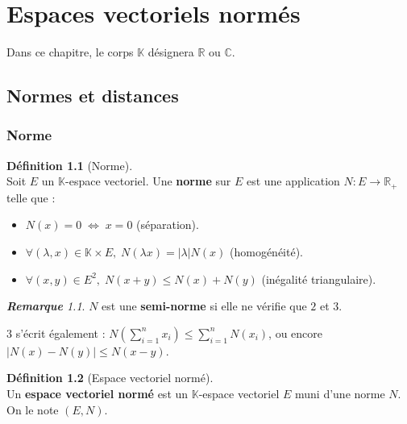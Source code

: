 \documentclass[12pt]{book}
\let\ensembleNombre\mathbb
\newcommand*\R{\ensuremath{\ensembleNombre{R}}}
\newcommand*\C{\ensuremath{\ensembleNombre{C}}}
\newcommand*\K{\ensuremath{\ensembleNombre{K}}}
\theoremstyle{definition}
\newtheorem*{defi}{Définition}
\theoremstyle{remark}
\newtheorem*{rem}{\textbf{Remarque}}
\newenvironment{fdef}
  {\begin{mdframed}[roundcorner=10pt, linewidth=1pt]\begin{defi}}
  {\end{defi}\end{mdframed}}
\begin{document}
\chapter{Espaces vectoriels normés}
	Dans ce chapitre, le corps $\K$ désignera $\R$ ou $\C$.
	
	\section{Normes et distances}
		\subsection{Norme}
	\begin{fdef}[Norme]\mbox{~}\\
	Soit $E$ un $\K$-espace vectoriel. Une \textbf{norme} sur $E$ est une application $N : E \longrightarrow \R_+$ telle que :
	\begin{itemize}
	\item[1)] $N(x) = 0 \;\Longleftrightarrow\; x = 0$ (séparation).
	\item[2)] $\forall (\lambda, x) \in \K \times E,\; N(\lambda x) = |\lambda|N(x)$ (homogénéité).
	\item[3)] $\forall (x,y) \in E^2, \; N(x+y) \leq N(x) + N(y)$ (inégalité triangulaire).
	\end{itemize}
	\end{fdef}
	
	\begin{rem}
	$N$ est une \textbf{semi-norme} si elle ne vérifie que $2$ et $3$.
	\end{rem}
	
	$3$ s'écrit également : $N\left( \sum_{i=1}^n x_i \right) \leq \sum_{i=1}^n N(x_i)$, ou encore $|N(x) - N(y)| \leq N(x-y)$.
	
	\begin{fdef}[Espace vectoriel normé]\mbox{~}\\
	Un \textbf{espace vectoriel normé} est un $\K$-espace vectoriel $E$ muni d'une norme $N$. On le note $(E,N)$.
	\end{fdef}
	
\end{document}
